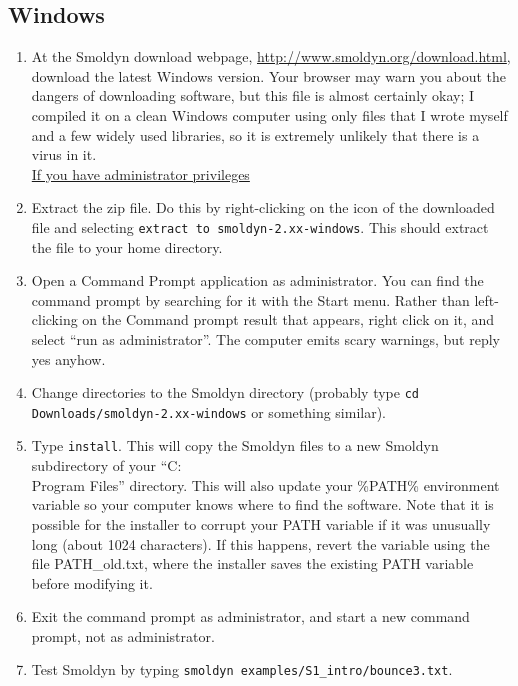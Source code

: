 \documentclass {book}
\newcommand {\ttt} {\texttt}
\begin{document}
\subsection*{Windows}
\begin{enumerate}
\item At the Smoldyn download webpage, \url{http://www.smoldyn.org/download.html}, download the latest Windows version. Your browser may warn you about the dangers of downloading software, but this file is almost certainly okay; I compiled it on a clean Windows computer using only files that I wrote myself and a few widely used libraries, so it is extremely unlikely that there is a virus in it.\\

\underline{If you have administrator privileges}
\item Extract the zip file. Do this by right-clicking on the icon of the downloaded file and selecting \ttt{extract to smoldyn-2.xx-windows}. This should extract the file to your home directory.
\item Open a Command Prompt application as administrator. You can find the command prompt by searching for it with the Start menu. Rather than left-clicking on the Command prompt result that appears, right click on it, and select ``run as administrator''. The computer emits scary warnings, but reply yes anyhow.
\item Change directories to the Smoldyn directory (probably type \ttt{cd Downloads/smoldyn-2.xx-windows} or something similar).
\item Type \ttt{install}. This will copy the Smoldyn files to a new Smoldyn subdirectory of your ``C:\\Program Files'' directory. This will also update your \%PATH\% environment variable so your computer knows where to find the software. Note that it is possible for the installer to corrupt your PATH variable if it was unusually long (about 1024 characters). If this happens, revert the variable using the file PATH\_old.txt, where the installer saves the existing PATH variable before modifying it.
\item Exit the command prompt as administrator, and start a new command prompt, not as administrator.
\item Test Smoldyn by typing \ttt{smoldyn examples/S1\_intro/bounce3.txt}.\\


\end{enumerate}
\end{document}
